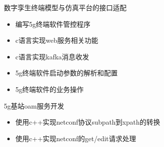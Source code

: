  \item 数字孪生终端模型与仿真平台的接口适配
  \begin{itemize}
    \item 编写5g终端软件管控程序
    \item c语言实现web服务相关功能
    \item c语言实现kafka消息收发
    \item 5g终端软件启动参数的解析和配置
    \item 5g终端软件的业务操作
  \end{itemize}
  \item 5g基站oam服务开发
  \begin{itemize}
    \item 使用c++实现netconf协议subpath到xpath的转换
    \item 使用c++实现netconf的get/edit请求处理
  \end{itemize}
